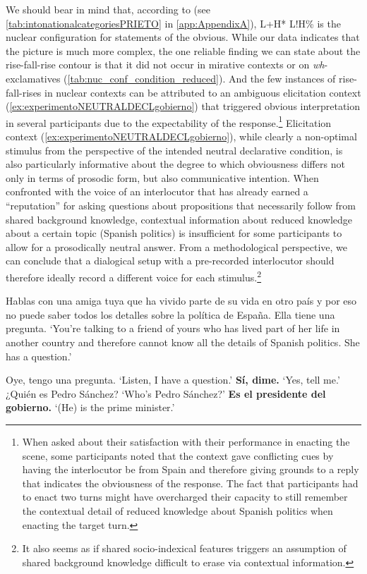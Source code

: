 We should bear in mind that, according to \citet{HualdePrieto2015} (see \autoref{tab:intonationalcategoriesPRIETO} in \autoref{app:AppendixA}), L+H* L!H\% is the nuclear configuration for statements of the obvious. While our data indicates that the picture is much more complex, the one reliable finding we can state about the rise-fall-rise contour is that it did not occur in mirative contexts or on \textit{wh}-exclamatives (\autoref{tab:nuc_conf_condition_reduced}). And the few instances of rise-fall-rises in nuclear contexts can be attributed to an ambiguous elicitation context (\ref{ex:experimentoNEUTRALDECLgobierno}) that triggered obvious interpretation in several participants due to the expectability of the response.\footnote{When asked about their satisfaction with their performance in enacting the scene, some participants noted that the context gave conflicting cues by having the interlocutor be from Spain and therefore giving grounds to a reply that indicates the obviousness of the response. The fact that participants had to enact two turns might have overcharged their capacity to still remember the contextual detail of reduced knowledge about Spanish politics when enacting the target turn.} Elicitation context (\ref{ex:experimentoNEUTRALDECLgobierno}), while clearly a non-optimal stimulus from the perspective of the intended neutral declarative condition, is also particularly informative about the degree to which obviousness differs not only in terms of prosodic form, but also communicative intention. When confronted with the voice of an interlocutor that has already earned a ``reputation'' for asking questions about propositions that necessarily follow from shared background knowledge, contextual information about reduced knowledge about a certain topic (Spanish politics) is insufficient for some participants to allow for a prosodically neutral answer. From a methodological perspective, we can conclude that a dialogical setup with a pre-recorded interlocutor should therefore ideally record a different voice for each stimulus.\footnote{It also seems as if shared socio-indexical features triggers an assumption of shared background knowledge difficult to erase via contextual information.}

\begin{exe}
		\ex \label{ex:experimentoNEUTRALDECLgobierno}
		Hablas con una amiga tuya que ha vivido parte de su vida en otro país y por eso no puede saber todos los detalles sobre la política de España. Ella tiene una pregunta.
		\glt `You're talking to a friend of yours who has lived part of her life in another country and therefore cannot know all the details of Spanish politics. She has a question.'
		\begin{xlist}
		 Oye, tengo una pregunta. \href{https://osf.io/whnsu/}{\faVolumeUp}
                 \glt `Listen, I have a question.'
         \textbf{Sí, dime.} 
		         \glt `Yes, tell me.'
		 ¿Quién es Pedro Sánchez? \href{https://osf.io/3uw7x/}{\faVolumeUp}
				\glt `Who's Pedro Sánchez?'
		 \textbf{Es el presidente del gobierno.}
				\glt `(He) is the prime minister.'
		\end{xlist}
\end{exe}

